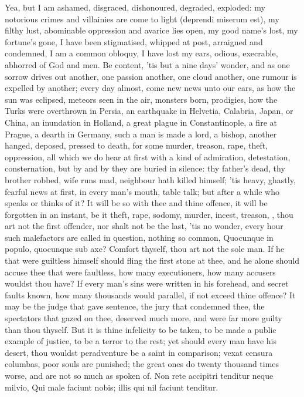 {Yea, but I am ashamed, disgraced, dishonoured, degraded, exploded: my
notorious crimes and villainies are come to light (deprendi miserum
est), my filthy lust, abominable oppression and avarice lies open, my
good name's lost, my fortune's gone, I have been stigmatised, whipped
at post, arraigned and condemned, I am a common obloquy, I have lost my
ears, odious, execrable, abhorred of God and men. Be content, 'tis but
a nine days' wonder, and as one sorrow drives out another, one passion
another, one cloud another, one rumour is expelled by another; every
day almost, come new news unto our ears, as how the sun was eclipsed,
meteors seen in the air, monsters born, prodigies, how the Turks were
overthrown in Persia, an earthquake in Helvetia, Calabria, Japan, or
China, an inundation in Holland, a great plague in Constantinople, a
fire at Prague, a dearth in Germany, such a man is made a lord, a
bishop, another hanged, deposed, pressed to death, for some murder,
treason, rape, theft, oppression, all which we do hear at first with a
kind of admiration, detestation, consternation, but by and by they are
buried in silence: thy father's dead, thy brother robbed, wife runs
mad, neighbour hath killed himself; 'tis heavy, ghastly, fearful news
at first, in every man's mouth, table talk; but after a while who
speaks or thinks of it? It will be so with thee and thine offence, it
will be forgotten in an instant, be it theft, rape, sodomy, murder,
incest, treason, \etc{}, thou art not the first offender, nor shalt not be
the last, 'tis no wonder, every hour such malefactors are called in
question, nothing so common, Quocunque in populo, quocunque sub axe?
Comfort thyself, thou art not the sole man. If he that were
guiltless himself should fling the first stone at thee, and he alone
should accuse thee that were faultless, how many executioners, how many
accusers wouldst thou have? If every man's sins were written in his
forehead, and secret faults known, how many thousands would parallel,
if not exceed thine offence? It may be the judge that gave sentence,
the jury that condemned thee, the spectators that gazed on thee,
deserved much more, and were far more guilty than thou thyself. But it
is thine infelicity to be taken, to be made a public example of
justice, to be a terror to the rest; yet should every man have his
desert, thou wouldst peradventure be a saint in comparison; vexat
censura columbas, poor souls are punished; the great ones do twenty
thousand times worse, and are not so much as spoken of.
Non rete accipitri tenditur neque milvio,
Qui male faciunt nobis; illis qui nil faciunt tenditur.

}
